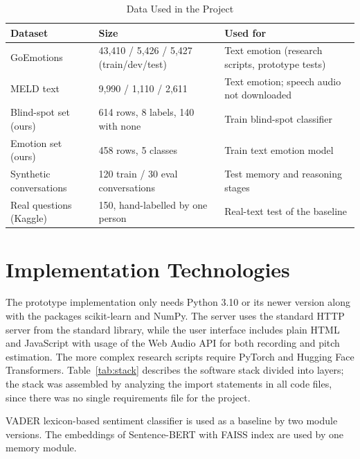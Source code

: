 \documentclass[conference]{IEEEtran}
\begin{document}
\begin{table}[htbp]
\caption{Data Used in the Project}
\label{tab:data}
\begin{center}
\small
\begin{tabular}{|p{1.6cm}|p{2.0cm}|p{3.4cm}|}
\hline
\textbf{Dataset} & \textbf{Size} & \textbf{Used for} \\
\hline
GoEmotions \cite{r24} & 43,410 / 5,426 / 5,427 (train/dev/test) & Text emotion (research scripts, prototype tests) \\
\hline
MELD text \cite{r25} & 9,990 / 1,110 / 2,611 & Text emotion; speech audio not downloaded \\
\hline
Blind-spot set (ours) & 614 rows, 8 labels, 140 with none & Train blind-spot classifier \\
\hline
Emotion set (ours) & 458 rows, 5 classes & Train text emotion model \\
\hline
Synthetic conversations & 120 train / 30 eval conversations & Test memory and reasoning stages \\
\hline
Real questions (Kaggle) & 150, hand-labelled by one person & Real-text test of the baseline \\
\hline
\end{tabular}
\end{center}
\end{table}

\section{Implementation Technologies}
The prototype implementation only needs Python 3.10 or its newer version along with the packages scikit-learn \cite{r30} and NumPy. The server uses the standard HTTP server from the standard library, while the user interface includes plain HTML and JavaScript with usage of the Web Audio API for both recording and pitch estimation. The more complex research scripts require PyTorch and Hugging Face Transformers. Table~\ref{tab:stack} describes the software stack divided into layers; the stack was assembled by analyzing the import statements in all code files, since there was no single requirements file for the project.

VADER \cite{r27} lexicon-based sentiment classifier is used as a baseline by two module versions. The embeddings of Sentence-BERT \cite{r28} with FAISS index \cite{r29} are used by one memory module.
\end{document}
